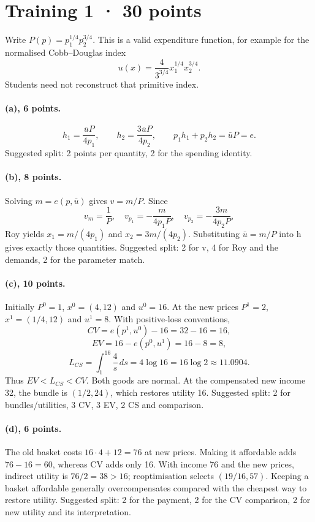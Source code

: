 \section*{Training 1 · 30 points}
Write $P(p)=p_1^{1/4}p_2^{3/4}$. This is a valid expenditure function, for
example for the normalised Cobb--Douglas index
\[
 u(x)=\frac4{3^{3/4}}x_1^{1/4}x_2^{3/4}.
\]
Students need not reconstruct that primitive index.

\paragraph{(a), 6 points.}
\[
 h_1=\frac{\bar uP}{4p_1},\qquad
 h_2=\frac{3\bar uP}{4p_2},\qquad
 p_1h_1+p_2h_2=\bar uP=e.
\]
Suggested split: 2 points per quantity, 2 for the spending identity.

\paragraph{(b), 8 points.}
Solving $m=e(p,\bar u)$ gives $v=m/P$. Since
\[
 v_m=\frac1P,\quad v_{p_1}=-\frac{m}{4p_1P},\quad
 v_{p_2}=-\frac{3m}{4p_2P},
\]
Roy yields $x_1=m/(4p_1)$ and $x_2=3m/(4p_2)$. Substituting
$\bar u=m/P$ into h gives exactly those quantities. Suggested split:
2 for v, 4 for Roy and the demands, 2 for the parameter match.

\paragraph{(c), 10 points.}
Initially $P^0=1$, $x^0=(4,12)$ and $u^0=16$. At the new prices
$P^1=2$, $x^1=(1/4,12)$ and $u^1=8$.
With positive-loss conventions,
\[
 CV=e(p^1,u^0)-16=32-16=16,
\]
\[
 EV=16-e(p^0,u^1)=16-8=8,
\]
\[
 L_{CS}=\int_1^{16}\frac4s\,ds=4\log16=16\log2\approx11.0904.
\]
Thus $EV<L_{CS}<CV$. Both goods are normal. At the compensated new
income 32, the bundle is $(1/2,24)$, which restores utility 16.
Suggested split: 2 for bundles/utilities, 3 CV, 3 EV, 2 CS and comparison.

\paragraph{(d), 6 points.}
The old basket costs $16\cdot4+12=76$ at new prices. Making it affordable
adds $76-16=60$, whereas CV adds only 16. With income 76 and the new
prices, indirect utility is $76/2=38>16$; reoptimisation selects
$(19/16,57)$. Keeping a basket affordable generally overcompensates compared
with the cheapest way to restore utility. Suggested split: 2 for the
payment, 2 for the CV comparison, 2 for new utility and its interpretation.
